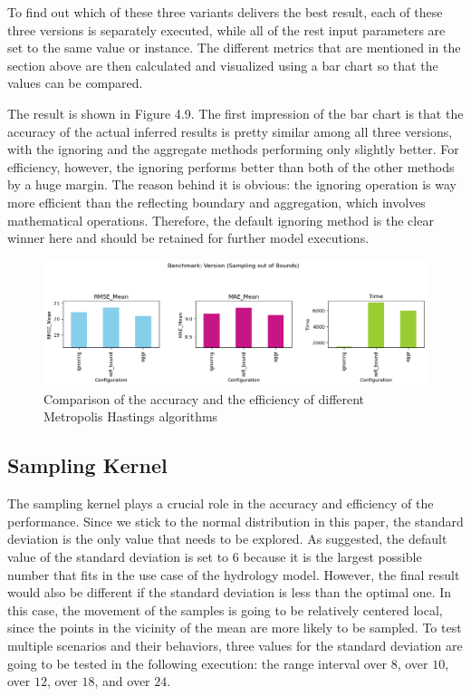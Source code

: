 To find out which of these three variants delivers the best result, each of these three versions is separately executed, while all of the rest input parameters are set to the same value or instance. The different metrics that are mentioned in the section above are then calculated and visualized using a bar chart so that the values can be compared. 

The result is shown in Figure 4.9. The first impression of the bar chart is that the accuracy of the actual inferred results is pretty similar among all three versions, with the ignoring and the aggregate methods performing only slightly better. For efficiency, however, the ignoring performs better than both of the other methods by a huge margin. The reason behind it is obvious: the ignoring operation is way more efficient than the reflecting boundary and aggregation, which involves mathematical operations. Therefore, the default ignoring method is the clear winner here and should be retained for further model executions.


\begin{figure}[H]
    \centering
    \includegraphics[width=1\textwidth]{figures/basic_mh/benchmark/sampling_otb.png}
    \captionsetup{width=.8\textwidth}
    \caption{Comparison of the accuracy and the efficiency of different Metropolis Hastings algorithms}
    \label{fig:enter-label}
\end{figure}



\subsection{Sampling Kernel}
The sampling kernel plays a crucial role in the accuracy and efficiency of the performance. Since we stick to the normal distribution in this paper, the standard deviation is the only value that needs to be explored. As suggested, the default value of the standard deviation is set to $6$ because it is the largest possible number that fits in the use case of the hydrology model. However, the final result would also be different if the standard deviation is less than the optimal one. In this case, the movement of the samples is going to be relatively centered local, since the points in the vicinity of the mean are more likely to be sampled. To test multiple scenarios and their behaviors, three values for the standard deviation are going to be tested in the following execution: the range interval over $8$, over $10$, over $12$, over $18$, and over $24$.

